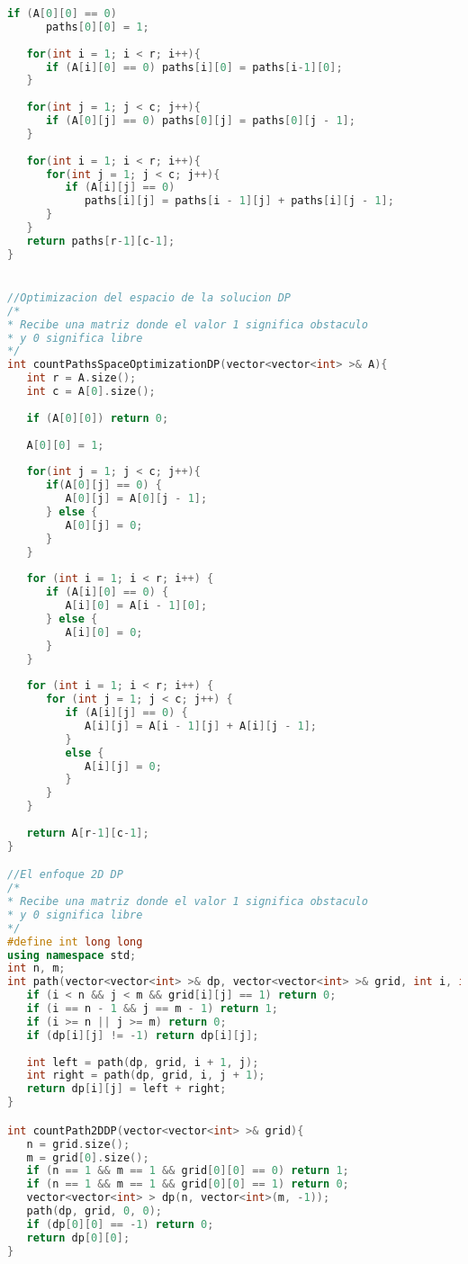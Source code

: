 \begin{lstlisting}[language=C++]
   if (A[0][0] == 0)
      paths[0][0] = 1;
	
   for(int i = 1; i < r; i++){
      if (A[i][0] == 0) paths[i][0] = paths[i-1][0];
   }
	
   for(int j = 1; j < c; j++){
      if (A[0][j] == 0) paths[0][j] = paths[0][j - 1];
   }  
	
   for(int i = 1; i < r; i++){
      for(int j = 1; j < c; j++){
         if (A[i][j] == 0)
            paths[i][j] = paths[i - 1][j] + paths[i][j - 1];
      } 
   }
   return paths[r-1][c-1];
}


//Optimizacion del espacio de la solucion DP
/*
* Recibe una matriz donde el valor 1 significa obstaculo
* y 0 significa libre
*/
int countPathsSpaceOptimizationDP(vector<vector<int> >& A){
   int r = A.size();
   int c = A[0].size();
   
   if (A[0][0]) return 0;
	
   A[0][0] = 1;
   
   for(int j = 1; j < c; j++){
      if(A[0][j] == 0) {
         A[0][j] = A[0][j - 1];
      } else {
         A[0][j] = 0;
      }
   }
   
   for (int i = 1; i < r; i++) {
      if (A[i][0] == 0) {
         A[i][0] = A[i - 1][0];
      } else {
         A[i][0] = 0;
      }
   }
	
   for (int i = 1; i < r; i++) {
      for (int j = 1; j < c; j++) {
         if (A[i][j] == 0) {
            A[i][j] = A[i - 1][j] + A[i][j - 1];
         }
         else {
            A[i][j] = 0;
         }
      }
   }
   
   return A[r-1][c-1];
}

//El enfoque 2D DP
/*
* Recibe una matriz donde el valor 1 significa obstaculo
* y 0 significa libre
*/
#define int long long
using namespace std;
int n, m;
int path(vector<vector<int> >& dp, vector<vector<int> >& grid, int i, int j){
   if (i < n && j < m && grid[i][j] == 1) return 0;
   if (i == n - 1 && j == m - 1) return 1;
   if (i >= n || j >= m) return 0;
   if (dp[i][j] != -1) return dp[i][j];
   
   int left = path(dp, grid, i + 1, j);
   int right = path(dp, grid, i, j + 1);
   return dp[i][j] = left + right;
}

int countPath2DDP(vector<vector<int> >& grid){
   n = grid.size();
   m = grid[0].size();
   if (n == 1 && m == 1 && grid[0][0] == 0) return 1;
   if (n == 1 && m == 1 && grid[0][0] == 1) return 0;
   vector<vector<int> > dp(n, vector<int>(m, -1));
   path(dp, grid, 0, 0);
   if (dp[0][0] == -1) return 0;
   return dp[0][0];
}


\end{lstlisting}

